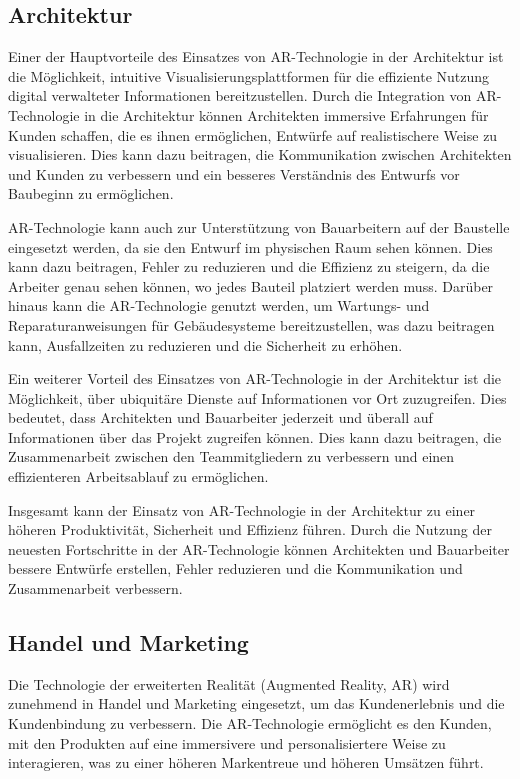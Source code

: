 \subsection{Architektur}
Einer der Hauptvorteile des Einsatzes von AR-Technologie in der Architektur ist die Möglichkeit, intuitive Visualisierungsplattformen für die effiziente Nutzung digital verwalteter Informationen bereitzustellen. Durch die Integration von AR-Technologie in die Architektur können Architekten immersive Erfahrungen für Kunden schaffen, die es ihnen ermöglichen, Entwürfe auf realistischere Weise zu visualisieren. Dies kann dazu beitragen, die Kommunikation zwischen Architekten und Kunden zu verbessern und ein besseres Verständnis des Entwurfs vor Baubeginn zu ermöglichen. 

AR-Technologie kann auch zur Unterstützung von Bauarbeitern auf der Baustelle eingesetzt werden, da sie den Entwurf im physischen Raum sehen können. Dies kann dazu beitragen, Fehler zu reduzieren und die Effizienz zu steigern, da die Arbeiter genau sehen können, wo jedes Bauteil platziert werden muss. Darüber hinaus kann die AR-Technologie genutzt werden, um Wartungs- und Reparaturanweisungen für Gebäudesysteme bereitzustellen, was dazu beitragen kann, Ausfallzeiten zu reduzieren und die Sicherheit zu erhöhen. 

Ein weiterer Vorteil des Einsatzes von AR-Technologie in der Architektur ist die Möglichkeit, über ubiquitäre Dienste auf Informationen vor Ort zuzugreifen. Dies bedeutet, dass Architekten und Bauarbeiter jederzeit und überall auf Informationen über das Projekt zugreifen können. Dies kann dazu beitragen, die Zusammenarbeit zwischen den Teammitgliedern zu verbessern und einen effizienteren Arbeitsablauf zu ermöglichen. 

Insgesamt kann der Einsatz von AR-Technologie in der Architektur zu einer höheren Produktivität, Sicherheit und Effizienz führen. Durch die Nutzung der neuesten Fortschritte in der AR-Technologie können Architekten und Bauarbeiter bessere Entwürfe erstellen, Fehler reduzieren und die Kommunikation und Zusammenarbeit verbessern. \cite{Chi2013ResearchTA}

\subsection{Handel und Marketing}

Die Technologie der erweiterten Realität (Augmented Reality, AR) wird zunehmend in Handel und Marketing eingesetzt, um das Kundenerlebnis und die Kundenbindung zu verbessern. Die AR-Technologie ermöglicht es den Kunden, mit den Produkten auf eine immersivere und personalisiertere Weise zu interagieren, was zu einer höheren Markentreue und höheren Umsätzen führt.


